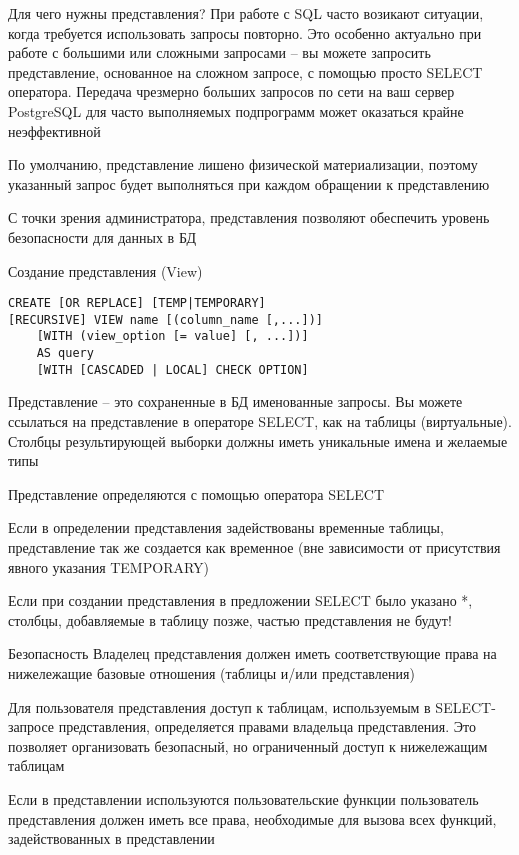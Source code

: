 \documentclass[12pt]{article}
\begin{document}
\begin{Remark}{Для чего нужны представления?}
    При работе с SQL часто возикают ситуации, когда требуется использовать запросы повторно. Это особенно актуально при работе с большими или сложными запросами -- вы можете запросить представление, основанное на сложном запросе, с помощью просто SELECT оператора. Передача чрезмерно больших запросов по сети на ваш сервер PostgreSQL для часто выполняемых подпрограмм может оказаться крайне неэффективной

    По умолчанию, представление лишено физической материализации, поэтому указанный запрос будет выполняться при каждом обращении к представлению 

    С точки зрения администратора, представления позволяют обеспечить уровень безопасности для данных в БД 
\end{Remark}

\begin{defin}{Создание представления (View)}
\begin{lstlisting}
CREATE [OR REPLACE] [TEMP|TEMPORARY] 
[RECURSIVE] VIEW name [(column_name [,...])]
    [WITH (view_option [= value] [, ...])]
    AS query
    [WITH [CASCADED | LOCAL] CHECK OPTION]
\end{lstlisting}

    Представление -- это сохраненные в БД именованные запросы. Вы можете ссылаться на представление в операторе SELECT, как на таблицы (виртуальные). Столбцы результирующей выборки должны иметь уникальные имена и желаемые типы 

    Представление определяются с помощью оператора SELECT 

    Если в определении представления задействованы временные таблицы, представление так же создается как временное (вне зависимости от присутствия явного указания TEMPORARY)

    Если при создании представления в предложении SELECT было указано *, столбцы, добавляемые в таблицу позже, частью представления не будут!
\end{defin}

\begin{nota}{Безопасность}
    Владелец представления должен иметь соответствующие права на нижележащие базовые отношения (таблицы и/или представления)

    Для пользователя представления доступ к таблицам, используемым в SELECT-запросе представления, определяется правами владельца представления. Это позволяет организовать безопасный, но ограниченный доступ к нижележащим таблицам
    
    Если в представлении используются пользовательские функции пользователь представления должен иметь все права, необходимые для вызова всех функций, задействованных в представлении 
\end{nota}
\end{document}

